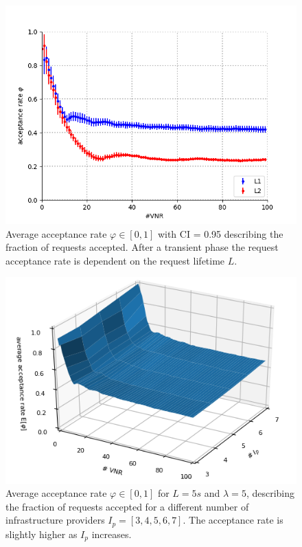 \begin{figure}[bth]
	\centering
	\includegraphics[scale=0.65]{gfx/ev_acceptance_rate.png}    
  	\caption{Average acceptance rate $\varphi \in [0,1]$ with CI = 0.95 describing the fraction of requests accepted. After a transient phase the request acceptance rate is dependent on the request lifetime $L$.}
  	\label{fig:acceptance_rate}
\end{figure}

\begin{figure}[h!]
	\centering
	\includegraphics[scale=0.9]{gfx/ev_acceptance_rate3D.png}    
  	\caption{Average acceptance rate $\varphi \in [0,1]$ for $L = 5s$ and $\lambda = 5$, describing the fraction of requests accepted for a different number of infrastructure providers $I_p =[3,4,5,6,7]$. The acceptance rate is slightly higher as $I_p$ increases.}
  	\label{fig:acceptance_rate_3D}
\end{figure}

